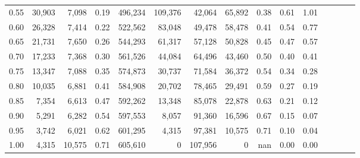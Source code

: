 \begin{tabular}{rrrcrrrrrrrrrrr}
0.55 &  30,903 &   7,098 &                                       0.19 &  496,234 &  109,376 &   42,064 &   65,892 &  0.38 &  0.61 &                         1.01 \\
0.60 &  26,328 &   7,414 &                                       0.22 &  522,562 &   83,048 &   49,478 &   58,478 &  0.41 &  0.54 &                         0.77 \\
0.65 &  21,731 &   7,650 &                                       0.26 &  544,293 &   61,317 &   57,128 &   50,828 &  0.45 &  0.47 &                         0.57 \\
0.70 &  17,233 &   7,368 &                                       0.30 &  561,526 &   44,084 &   64,496 &   43,460 &  0.50 &  0.40 &                         0.41 \\
0.75 &  13,347 &   7,088 &                                       0.35 &  574,873 &   30,737 &   71,584 &   36,372 &  0.54 &  0.34 &                         0.28 \\
0.80 &  10,035 &   6,881 &                                       0.41 &  584,908 &   20,702 &   78,465 &   29,491 &  0.59 &  0.27 &                         0.19 \\
0.85 &   7,354 &   6,613 &                                       0.47 &  592,262 &   13,348 &   85,078 &   22,878 &  0.63 &  0.21 &                         0.12 \\
0.90 &   5,291 &   6,282 &                                       0.54 &  597,553 &    8,057 &   91,360 &   16,596 &  0.67 &  0.15 &                         0.07 \\
0.95 &   3,742 &   6,021 &                                       0.62 &  601,295 &    4,315 &   97,381 &   10,575 &  0.71 &  0.10 &                         0.04 \\
1.00 &   4,315 &  10,575 &                                       0.71 &  605,610 &        0 &  107,956 &        0 &   nan &  0.00 &                         0.00 \\
\bottomrule
\end{tabular}

